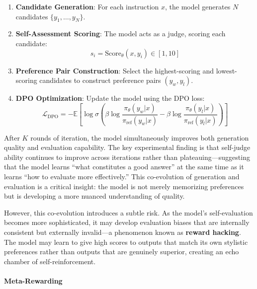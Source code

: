 \begin{enumerate}
\item \textbf{Candidate Generation}: For each instruction $x$, the model generates $N$ candidates $\{y_1, \ldots, y_N\}$.

\item \textbf{Self-Assessment Scoring}: The model acts as a judge, scoring each candidate:
\begin{equation}
s_i = \mathrm{Score}_\theta(x, y_i) \in [1, 10]
\label{eq:selfreward-score}
\end{equation}

\item \textbf{Preference Pair Construction}: Select the highest-scoring and lowest-scoring candidates to construct preference pairs $(y_w, y_l)$.

\item \textbf{DPO Optimization}: Update the model using the DPO loss:
\begin{equation}
\mathcal{L}_{\mathrm{DPO}} = -\mathbb{E}\left[\log \sigma\left(\beta \log \frac{\pi_\theta(y_w|x)}{\pi_{\mathrm{ref}}(y_w|x)} - \beta \log \frac{\pi_\theta(y_l|x)}{\pi_{\mathrm{ref}}(y_l|x)}\right)\right]
\label{eq:selfreward-dpo}
\end{equation}
\end{enumerate}

After $K$ rounds of iteration, the model simultaneously improves both generation quality and evaluation capability. The key experimental finding is that self-judge ability continues to improve across iterations rather than plateauing---suggesting that the model learns ``what constitutes a good answer'' at the same time as it learns ``how to evaluate more effectively.'' This co-evolution of generation and evaluation is a critical insight: the model is not merely memorizing preferences but is developing a more nuanced understanding of quality.

However, this co-evolution introduces a subtle risk. As the model's self-evaluation becomes more sophisticated, it may develop evaluation biases that are internally consistent but externally invalid---a phenomenon known as \textbf{reward hacking}. The model may learn to give high scores to outputs that match its own stylistic preferences rather than outputs that are genuinely superior, creating an echo chamber of self-reinforcement.

\paragraph{Meta-Rewarding}

